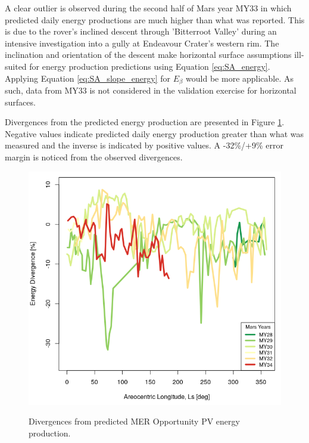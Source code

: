 
A clear outlier is observed during the second half of Mars year MY33 in which predicted daily energy productions are much higher than what was reported. This is due to the rover's inclined descent through 'Bitterroot Valley' during an intensive investigation into a gully at Endeavour Crater's western rim. The inclination and orientation of the descent make horizontal surface assumptions ill-suited for energy production predictions using Equation \ref{eq:SA_energy}. Applying Equation \ref{eq:SA_slope_energy} for $E_{\beta}$ would be more applicable. As such, data from MY33 is not considered in the validation exercise for horizontal surfaces.


Divergences from the predicted energy production are presented in Figure \ref{fig:plot:mer-energy-prediction-divergences}. Negative values indicate predicted daily energy production greater than what was measured and the inverse is indicated by positive values. A -32\%/+9\% error margin is noticed from the observed divergences.

\begin{figure}[H]
  \centering
  \hypersetup{linkcolor=captionTextColor}
  \includegraphics[width=0.8\linewidth]{sections/power-and-energy-predictions/plots/energy-prediction-divergences.png}\\
  \caption[Divergences from predicted MER Opportunity PV energy production]
          {Divergences from predicted MER Opportunity PV energy production.}
  \label{fig:plot:mer-energy-prediction-divergences}
\end{figure}

